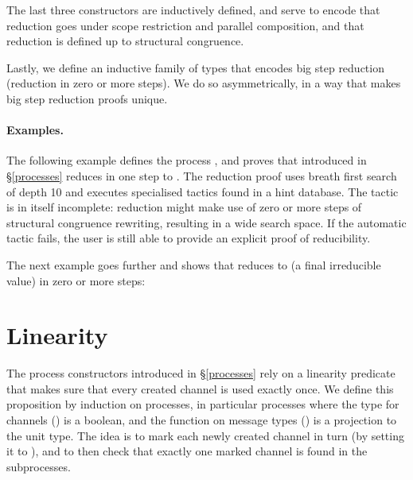 \documentclass{mproj}
\begin{document}

The last three constructors are inductively defined, and serve to encode that reduction goes under scope restriction and parallel composition, and that reduction is defined up to structural congruence.


Lastly, we define an inductive family of types that encodes big step reduction (reduction in zero or more steps). We do so asymmetrically, in a way that makes big step reduction proofs unique.


\paragraph{Examples.}

The following example defines the process , and proves that  introduced in \S \ref{processes} reduces in one step to . The reduction proof uses breath first search of depth 10 and executes specialised tactics found in a hint database. The tactic is in itself incomplete: reduction might make use of zero or more steps of structural congruence rewriting, resulting in a wide search space. If the automatic tactic fails, the user is still able to provide an explicit proof of reducibility.


The next example goes further and shows that  reduces to  (a final irreducible value) in zero or more steps:


\section{Linearity}\label{linearity}

The process constructors introduced in \S \ref{processes} rely on a linearity predicate that makes sure that every created channel is used exactly once. We define this proposition by induction on processes, in particular processes where the type for channels () is a boolean, and the function on message types () is a projection to the unit type. The idea is to mark each newly created channel in turn (by setting it to ), and to then check that exactly one marked channel is found in the subprocesses.
\end{document}

